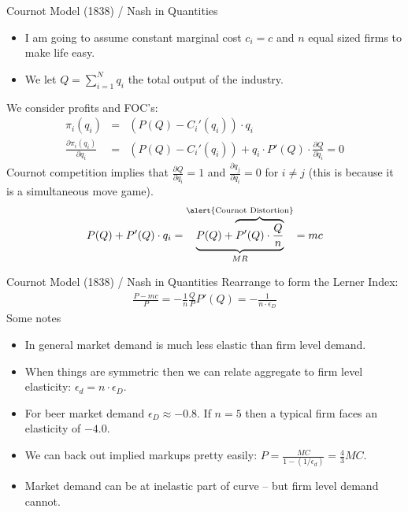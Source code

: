 \documentclass[xcolor=pdftex,dvipsnames,table,mathserif]{beamer}
\begin{document}
\begin{frame}{Cournot Model (1838) / Nash in Quantities}
\begin{itemize}
\item I am going to assume constant marginal cost $c_i = c$ and $n$ equal sized firms to make life easy. 
\item We let $Q=\sum_{i=1}^N q_i$ the total output of the industry.
\end{itemize}
We consider profits and FOC's:
\begin{eqnarray*}
\pi_i(q_i) &=& (P(Q) - C_i'(q_i) ) \cdot q_i\\
\frac{\partial \pi_i(q_i)}{\partial q_i} &=& (P(Q) - C_i'(q_i))  +  q_i  \cdot P'(Q) \cdot \frac{\partial Q}{\partial q_i}  = 0
\end{eqnarray*}
Cournot competition implies that $\frac{\partial Q}{\partial q_i} = 1$ and $\frac{\partial q_j}{\partial q_i} = 0$ for $i \neq j$ (this is because it is a simultaneous move game).
\begin{eqnarray*}
P(Q) + P'(Q) \cdot q_i = \underbrace{P(Q) + \overbrace{P'(Q) \cdot \frac{Q}{n}}}^{\text{\alert{Cournot Distortion}}}_{MR} =  mc
\end{eqnarray*}
\end{frame}

\begin{frame}{Cournot Model (1838) / Nash in Quantities}
Rearrange to form the Lerner Index:
\begin{eqnarray*}
\frac{P-mc}{P} = - \frac{1}{n} \frac{Q}{P} P'(Q) = - \frac{1}{n \cdot \epsilon_D}
\end{eqnarray*}
Some notes
\begin{itemize}
\item In general market demand is much less elastic than firm level demand.
\item When things are symmetric then we can relate aggregate to firm level elasticity: $\epsilon_d = n \cdot \epsilon_D$.
\item For beer market demand $\epsilon_D \approx -0.8$. If $n=5$ then a typical firm faces an elasticity of $-4.0$.
\item We can back out implied markups pretty easily: $P  = \frac{MC}{1-(1/\epsilon_d)}  = \frac{4}{3} MC$.
\item Market demand can be at inelastic part of curve -- but firm level demand cannot.
\end{itemize}
\end{frame}
\end{document}
